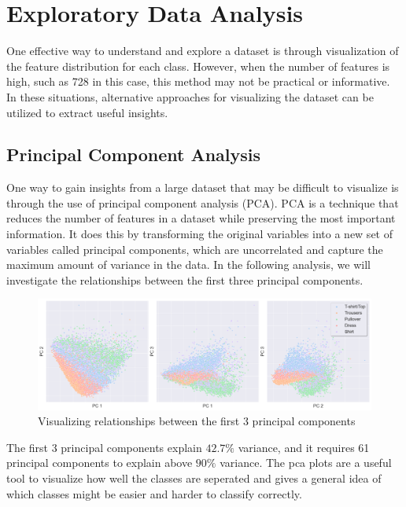 \section{Exploratory Data Analysis}

One effective way to understand and explore a dataset is through visualization of the feature distribution for each class.
However, when the number of features is high, such as 728 in this case, this method may not be practical or informative.
In these situations, alternative approaches for visualizing the dataset can be utilized to extract useful insights.

\subsection{Principal Component Analysis}
One way to gain insights from a large dataset that may be difficult to visualize is through the use of principal component analysis (PCA).
PCA is a technique that reduces the number of features in a dataset while preserving the most important information.
It does this by transforming the original variables into a new set of variables called principal components, which are uncorrelated and capture the maximum amount of variance in the data.
In the following analysis, we will investigate the relationships between the first three principal components.

\begin{figure}[H]
    \includegraphics[scale=0.30]{figures_for_report/PCA}
    \captionsetup{justification=centering,margin=2cm}
    \caption{Visualizing relationships between the first 3 principal components}
\end{figure}

The first 3 principal components explain $42.7\%$ variance, and it requires 61 principal components to explain above $90\%$ variance.
The pca plots are a useful tool to visualize how well the classes are seperated and gives a general idea of which classes might be easier and harder to classify correctly.

